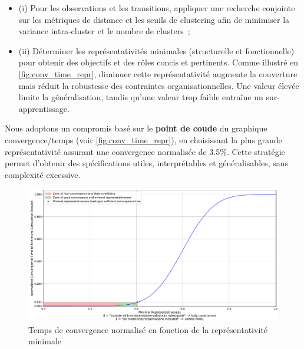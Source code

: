 \begin{itemize}
  \item (i) Pour les observations et les transitions, appliquer une recherche conjointe sur les métriques de distance et les seuils de clustering afin de minimiser la variance intra-cluster et le nombre de clusters~;
  \item (ii) Déterminer les représentativités minimales (structurelle et fonctionnelle) pour obtenir des objectifs et des rôles concis et pertinents. Comme illustré en \autoref{fig:conv_time_repr}, diminuer cette représentativité augmente la couverture mais réduit la robustesse des contraintes organisationnelles. Une valeur élevée limite la généralisation, tandis qu'une valeur trop faible entraîne un sur-apprentissage.
\end{itemize}

Nous adoptons un compromis basé sur le \textbf{point de coude} du graphique convergence/temps (voir \autoref{fig:conv_time_repr}), en choisissant la plus grande représentativité assurant une convergence normalisée de 3.5\%. Cette stratégie permet d'obtenir des spécifications utiles, interprétables et généralisables, sans complexité excessive.

\begin{figure}[h!]
  \centering
  \includegraphics[trim=0cm 0cm 0cm 0cm, clip, width=1.\linewidth]{figures/convergence_time_relative_to_representativeness.pdf}
  \caption{Temps de convergence normalisé en fonction de la représentativité minimale}
  \label{fig:conv_time_repr}
\end{figure}

